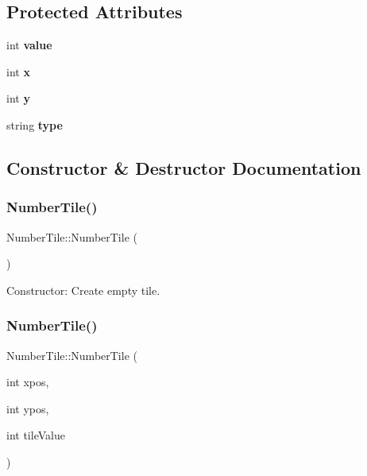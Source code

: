 \subsection*{Protected Attributes}
\begin{DoxyCompactItemize}
\item 
\mbox{\label{classNumberTile_a77109af85d97fdfb9761e8d0614c4641}} 
int {\bfseries value}
\item 
\mbox{\label{classNumberTile_afcfebf63fe430211a37f347dbd3bc69b}} 
int {\bfseries x}
\item 
\mbox{\label{classNumberTile_a1cd07ef9c3c90b475b50afd3cd77b719}} 
int {\bfseries y}
\item 
\mbox{\label{classNumberTile_aedea908097bbee85233f665705635b18}} 
string {\bfseries type}
\end{DoxyCompactItemize}


\subsection{Constructor \& Destructor Documentation}
\mbox{\label{classNumberTile_a8263f8868395d47c8cce9e5678e95434}} 
\subsubsection{\texorpdfstring{Number\+Tile()}{NumberTile()}\hspace{0.1cm}{\footnotesize\ttfamily [1/2]}}
{\footnotesize\ttfamily Number\+Tile\+::\+Number\+Tile (\begin{DoxyParamCaption}{ }\end{DoxyParamCaption})}

Constructor\+: Create empty tile. \mbox{\label{classNumberTile_a7ed5d800a193a4e925ac7543ec73d3b6}} 
\subsubsection{\texorpdfstring{Number\+Tile()}{NumberTile()}\hspace{0.1cm}{\footnotesize\ttfamily [2/2]}}
{\footnotesize\ttfamily Number\+Tile\+::\+Number\+Tile (\begin{DoxyParamCaption}\item[{int}]{xpos,  }\item[{int}]{ypos,  }\item[{int}]{tile\+Value }\end{DoxyParamCaption})}

